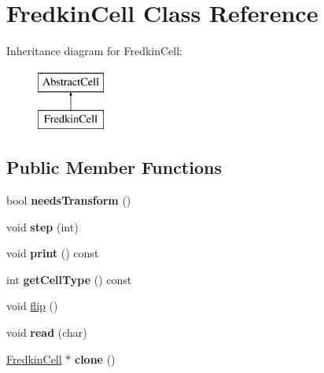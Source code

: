 \hypertarget{classFredkinCell}{\section{Fredkin\-Cell Class Reference}
\label{classFredkinCell}
}
Inheritance diagram for Fredkin\-Cell\-:\begin{figure}[H]
\begin{center}
\leavevmode
\includegraphics[height=2.000000cm]{classFredkinCell}
\end{center}
\end{figure}
\subsection*{Public Member Functions}
\begin{DoxyCompactItemize}
\item 
\hypertarget{classFredkinCell_a5ae41bba71089226e67e3d49ee5533d9}{bool {\bfseries needs\-Transform} ()}\label{classFredkinCell_a5ae41bba71089226e67e3d49ee5533d9}

\item 
\hypertarget{classFredkinCell_ae75fa4394227223f96d643d850ac2027}{void {\bfseries step} (int)}\label{classFredkinCell_ae75fa4394227223f96d643d850ac2027}

\item 
\hypertarget{classFredkinCell_a344bdea2238bb65b7d5013cf9359b3f5}{void {\bfseries print} () const }\label{classFredkinCell_a344bdea2238bb65b7d5013cf9359b3f5}

\item 
\hypertarget{classFredkinCell_ab550b7553cb649799f7c286369732527}{int {\bfseries get\-Cell\-Type} () const }\label{classFredkinCell_ab550b7553cb649799f7c286369732527}

\item 
void \hyperlink{classFredkinCell_a0a849ac1b7b8620429b2f5c139043e87}{flip} ()
\item 
\hypertarget{classFredkinCell_a92300644207f5fc72f9e44584acf7a18}{void {\bfseries read} (char)}\label{classFredkinCell_a92300644207f5fc72f9e44584acf7a18}

\item 
\hypertarget{classFredkinCell_a26ab307f5839cb7a7cf8d97ea27162f7}{\hyperlink{classFredkinCell}{Fredkin\-Cell} $\ast$ {\bfseries clone} ()}\label{classFredkinCell_a26ab307f5839cb7a7cf8d97ea27162f7}

\end{DoxyCompactItemize}
